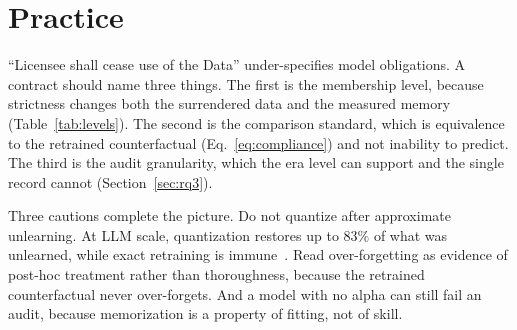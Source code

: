 \section{Practice}\label{sec:practice}

``Licensee shall cease use of the Data'' under-specifies model
obligations. A contract should name three things. The first is the
membership level, because strictness changes both the surrendered
data and the measured memory (Table~\ref{tab:levels}). The second is
the comparison standard, which is equivalence to the retrained
counterfactual (Eq.~\ref{eq:compliance}) and not inability to
predict. The third is the audit granularity, which the era level can
support and the single record cannot (Section~\ref{sec:rq3}).

Three cautions complete the picture. Do not quantize after
approximate unlearning. At LLM scale, quantization restores up to
$83\%$ of what was unlearned, while exact retraining is
immune~\cite{zhang2025quantfail}. Read over-forgetting as evidence
of post-hoc treatment rather than thoroughness, because the
retrained counterfactual never over-forgets. And a model with no
alpha can still fail an audit, because memorization is a property of
fitting, not of skill.
